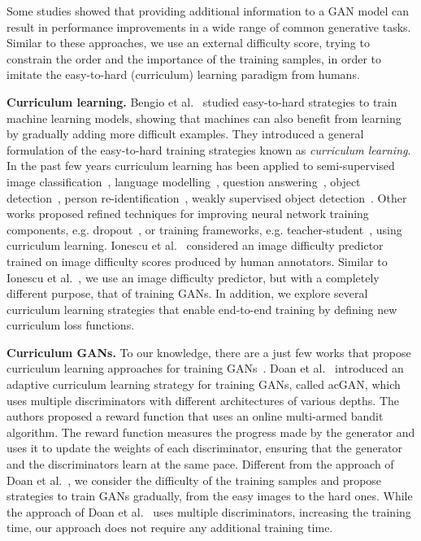 \documentclass[10pt,twocolumn,letterpaper]{article}
\begin{document}
Some studies \cite{Isola-CVPR-2017,Reed-ICML-2016,Wang-ECCV-2016} showed that providing additional information to a GAN model can result in performance improvements in a wide range of common generative tasks. Similar to these approaches, we use an external difficulty score, trying to constrain the order and the importance of the training samples, in order to imitate the easy-to-hard (curriculum) learning paradigm from humans. 



\noindent
{\bf Curriculum learning.}
Bengio et al.~\cite{Bengio-ICML-2009} studied easy-to-hard strategies to train machine learning models, showing that machines can also benefit from learning by gradually adding more difficult examples. They introduced a general formulation of the easy-to-hard training strategies known as \emph{curriculum learning}. In the past few years curriculum learning has been applied to semi-supervised image classification~\cite{Gong-TIP-2016}, language modelling~\cite{Graves-ICML-2017}, question answering~\cite{Graves-ICML-2017}, object detection~\cite{Soviany-CEFRL-2018,Soviany-SYNASC-2018,Wang-ICPR-2018,Zhang-IJCV-2019}, person re-identification~\cite{Wang-ECCV-2018}, weakly supervised object detection~\cite{Ionescu-CVPR-2016,Li-BMVC-2017}. Other works proposed refined techniques for improving neural network training components, e.g. dropout~\cite{Morerio-ICCV-2017}, or training frameworks, e.g. teacher-student~\cite{Jiang-ICML-2018}, using curriculum learning.
Ionescu et al.~\cite{Ionescu-CVPR-2016} considered an image difficulty predictor trained on image difficulty scores produced by human annotators. Similar to Ionescu et al.~\cite{Ionescu-CVPR-2016}, we use an image difficulty predictor, but with a completely different purpose, that of training GANs. In addition, we explore several curriculum learning strategies that enable end-to-end training by defining new curriculum loss functions.

\noindent
{\bf Curriculum GANs.}
To our knowledge, there are a just few works that propose curriculum learning approaches for training GANs~\cite{Doan-AAAI-2019,Ghasedi-CVPR-2019}. Doan et al.~\cite{Doan-AAAI-2019} introduced an adaptive curriculum learning strategy for training GANs, called acGAN, which uses multiple discriminators with different architectures of various depths. The authors proposed a reward function that uses an online multi-armed bandit algorithm. The reward function measures the progress made by the generator and uses it to update the weights of each discriminator, ensuring that the generator and the discriminators learn at the same pace. Different from the approach of Doan et al.~\cite{Doan-AAAI-2019}, we consider the difficulty of the training samples and propose strategies to train GANs gradually, from the easy images to the hard ones. While the approach of Doan et al.~\cite{Doan-AAAI-2019} uses multiple discriminators, increasing the training time, our approach does not require any additional training time. 
\end{document}

